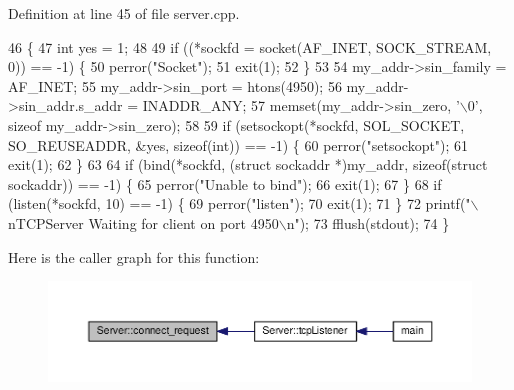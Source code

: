 Definition at line 45 of file server.\+cpp.


\begin{DoxyCode}
46 \{
47     \textcolor{keywordtype}{int} yes = 1;
48         
49     \textcolor{keywordflow}{if} ((*sockfd = socket(AF\_INET, SOCK\_STREAM, 0)) == -1) \{
50         perror(\textcolor{stringliteral}{"Socket"});
51         exit(1);
52     \}
53         
54     my\_addr->sin\_family = AF\_INET;
55     my\_addr->sin\_port = htons(4950);
56     my\_addr->sin\_addr.s\_addr = INADDR\_ANY;
57     memset(my\_addr->sin\_zero, \textcolor{charliteral}{'\(\backslash\)0'}, \textcolor{keyword}{sizeof} my\_addr->sin\_zero);
58         
59     \textcolor{keywordflow}{if} (setsockopt(*sockfd, SOL\_SOCKET, SO\_REUSEADDR, &yes, \textcolor{keyword}{sizeof}(\textcolor{keywordtype}{int})) == -1) \{
60         perror(\textcolor{stringliteral}{"setsockopt"});
61         exit(1);
62     \}
63         
64     \textcolor{keywordflow}{if} (bind(*sockfd, (\textcolor{keyword}{struct} sockaddr *)my\_addr, \textcolor{keyword}{sizeof}(\textcolor{keyword}{struct} sockaddr)) == -1) \{
65         perror(\textcolor{stringliteral}{"Unable to bind"});
66         exit(1);
67     \}
68     \textcolor{keywordflow}{if} (listen(*sockfd, 10) == -1) \{
69         perror(\textcolor{stringliteral}{"listen"});
70         exit(1);
71     \}
72     printf(\textcolor{stringliteral}{"\(\backslash\)nTCPServer Waiting for client on port 4950\(\backslash\)n"});
73     fflush(stdout);
74 \}
\end{DoxyCode}


Here is the caller graph for this function\+:
\nopagebreak
\begin{figure}[H]
\begin{center}
\leavevmode
\includegraphics[width=350pt]{class_server_a89d62ab21574021dcd9042c6e817fa48_icgraph}
\end{center}
\end{figure}


